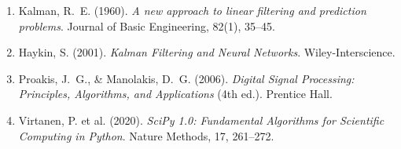 \documentclass[12pt,a4paper]{article}
\begin{document}
\begin{enumerate}
  \item Kalman, R.~E. (1960). \textit{A new approach to linear filtering and prediction
        problems}. Journal of Basic Engineering, 82(1), 35--45.
  \item Haykin, S. (2001). \textit{Kalman Filtering and Neural Networks}.
        Wiley-Interscience.
  \item Proakis, J.~G., \& Manolakis, D.~G. (2006). \textit{Digital Signal Processing:
        Principles, Algorithms, and Applications} (4th ed.). Prentice Hall.
  \item Virtanen, P. et al. (2020). \textit{SciPy 1.0: Fundamental Algorithms for
        Scientific Computing in Python}. Nature Methods, 17, 261--272.
\end{enumerate}
\end{document}
